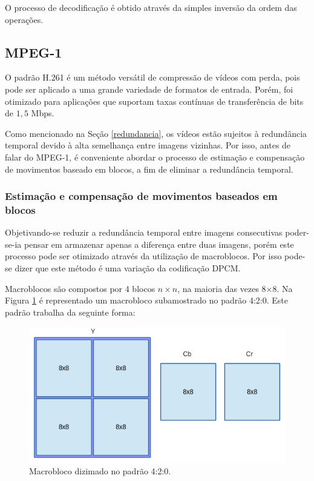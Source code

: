 O processo de decodificação é obtido através da simples inversão da ordem das operações.

\subsection{MPEG-1}
\label{mpeg}

O padrão H.261 \cite{ITU.1993} é um método versátil de compressão de vídeos com perda, pois pode ser aplicado a uma grande variedade de formatos de entrada. Porém, foi otimizado para aplicações que suportam taxas contínuas de transferência de bits de $ 1,5 $ Mbps.

Como mencionado na Seção \ref{redundancia}, os  vídeos estão sujeitos à redundância temporal devido à alta semelhança entre imagens vizinhas. Por isso, antes de falar do MPEG-1, é conveniente abordar o processo de estimação e compensação de movimentos baseado em blocos, a fim de eliminar a redundância temporal.

\subsubsection{Estimação e compensação de movimentos baseados em blocos}
\label{Est_Comp_Mov}

Objetivando-se reduzir a redundância temporal entre imagens consecutivas poder-se-ia pensar em armazenar apenas a diferença entre duas imagens, porém este processo pode ser otimizado através da utilização de macroblocos. Por isso pode-se dizer que este método é uma variação da codificação DPCM.

Macroblocos são compostos por 4 blocos $ n\times n $, na maioria das vezes 8$ \times $8. Na Figura \ref{fig:macrobloco} é representado um macrobloco subamostrado no padrão 4:2:0. Este padrão trabalha da seguinte forma:

\begin{figure}[!ht]
\begin{center}
\includegraphics[scale=0.4]{./Figures/png/macrobloco.png}
\caption{Macrobloco dizimado no padrão 4:2:0.}
\label{fig:macrobloco}
\end{center}
\end{figure}

